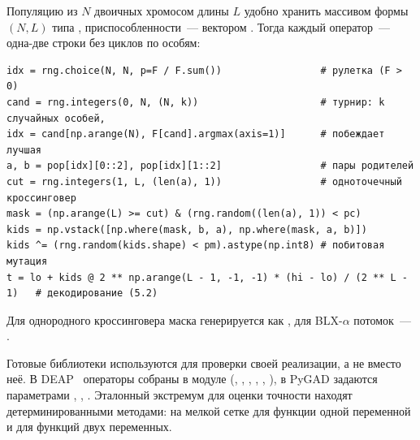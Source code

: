 Популяцию из $N$ двоичных хромосом длины $L$ удобно хранить массивом  формы $(N, L)$ типа
, приспособленности~--- вектором . Тогда каждый оператор~--- одна-две строки без
циклов по особям:
\begin{lstlisting}
idx = rng.choice(N, N, p=F / F.sum())                 # рулетка (F > 0)
cand = rng.integers(0, N, (N, k))                     # турнир: k случайных особей,
idx = cand[np.arange(N), F[cand].argmax(axis=1)]      # побеждает лучшая
a, b = pop[idx][0::2], pop[idx][1::2]                 # пары родителей
cut = rng.integers(1, L, (len(a), 1))                 # одноточечный кроссинговер
mask = (np.arange(L) >= cut) & (rng.random((len(a), 1)) < pc)
kids = np.vstack([np.where(mask, b, a), np.where(mask, a, b)])
kids ^= (rng.random(kids.shape) < pm).astype(np.int8) # побитовая мутация
t = lo + kids @ 2 ** np.arange(L - 1, -1, -1) * (hi - lo) / (2 ** L - 1)   # декодирование (5.2)
\end{lstlisting}
Для однородного кроссинговера маска генерируется как , для BLX-$\alpha$
потомок~--- .

Готовые библиотеки используются для проверки своей реализации, а не вместо неё. В DEAP~\cite{fortin2012}
операторы собраны в модуле  (, , ,
, , ), в PyGAD задаются параметрами
, , . Эталонный экстремум для
оценки точности находят детерминированными методами:  на
мелкой сетке для функции одной переменной и  для функций
двух переменных.

